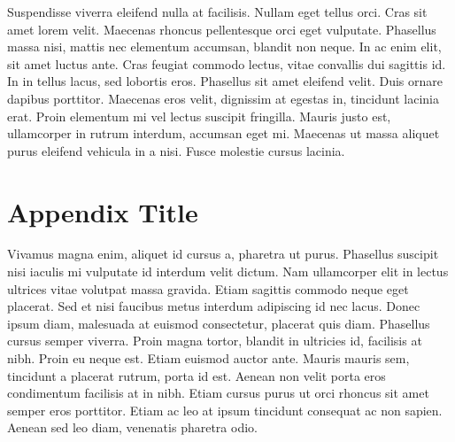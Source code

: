 \documentclass[draft,grl]{AGUTeX}
\begin{document}
\begin{article}
Suspendisse viverra eleifend nulla at facilisis. Nullam eget tellus orci. Cras sit amet lorem velit. Maecenas rhoncus pellentesque orci eget vulputate. Phasellus massa nisi, mattis nec elementum accumsan, blandit non neque. In ac enim elit, sit amet luctus ante. Cras feugiat commodo lectus, vitae convallis dui sagittis id. In in tellus lacus, sed lobortis eros. Phasellus sit amet eleifend velit. Duis ornare dapibus porttitor. Maecenas eros velit, dignissim at egestas in, tincidunt lacinia erat. Proin elementum mi vel lectus suscipit fringilla. Mauris justo est, ullamcorper in rutrum interdum, accumsan eget mi. Maecenas ut massa aliquet purus eleifend vehicula in a nisi. Fusce molestie cursus lacinia.





\appendix

\section{Appendix Title}

Vivamus magna enim, aliquet id cursus a, pharetra ut purus. Phasellus suscipit nisi iaculis mi vulputate id interdum velit dictum. Nam ullamcorper elit in lectus ultrices vitae volutpat massa gravida. Etiam sagittis commodo neque eget placerat. Sed et nisi faucibus metus interdum adipiscing id nec lacus. Donec ipsum diam, malesuada at euismod consectetur, placerat quis diam. Phasellus cursus semper viverra. Proin magna tortor, blandit in ultricies id, facilisis at nibh. Proin eu neque est. Etiam euismod auctor ante. Mauris mauris sem, tincidunt a placerat rutrum, porta id est. Aenean non velit porta eros condimentum facilisis at in nibh. Etiam cursus purus ut orci rhoncus sit amet semper eros porttitor. Etiam ac leo at ipsum tincidunt consequat ac non sapien. Aenean sed leo diam, venenatis pharetra odio.


\end{article}
\end{document}
